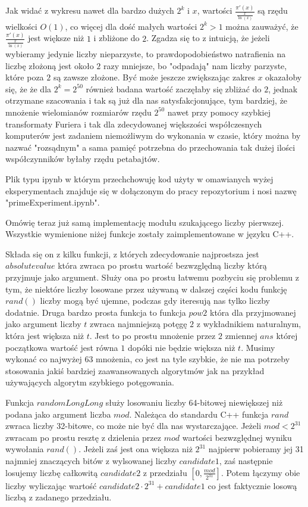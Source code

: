 \documentclass{article}
\begin{document}
Jak widać z wykresu nawet dla bardzo dużych $2^k$ i $x$, wartości $\frac{\pi'(x)}{\frac{x}{\ln(x)}}$ są 
rzędu wielkości $O(1)$, co więcej dla dość małych wartości $2^k>1$ można zauważyć, że $\frac{\pi'(x)}{\frac{x}{\ln(x)}}$ jest 
większe niż $1$ i zbliżone do $2$. Zgadza się to z intuicją, że jeżeli wybieramy jedynie liczby nieparzyste,
to prawdopodobieństwo natrafienia na liczbę złożoną jest około $2$ razy mniejsze, bo "odpadają" nam 
liczby parzyste, które poza $2$ są zawsze złożone. Być może jeszcze zwiększając zakres $x$ okazałoby się, że 
że dla $2^k=2^{50}$ również badana wartość zaczęłaby się zbliżać do $2$, jednak otrzymane szacowania i tak
są już dla nas satysfakcjonujące, tym bardziej, że mnożenie wielomianów rozmiarów rzędu $2^{50}$ nawet przy pomocy
szybkiej transformaty Furiera i tak dla zdecydowanej większości współczesnych komputerów jest zadaniem niemożliwym
do wykonania w czasie, który można by nazwać "rozsądnym" a sama pamięć potrzebna do przechowania
tak dużej ilości współczynników byłaby rzędu petabajtów. 

Plik typu ipynb w którym przechchowuję kod użyty w omawianych wyżej eksperymentach znajduje się
w dołączonym do pracy repozytorium i nosi nazwę "primeExperiment.ipynb".


Omówię teraz już samą implementację modułu szukającego liczby pierwszej. Wszystkie wymienione niżej funkcje zostały 
zaimplementowane w języku C++.

Składa się on z kilku funkcji, z których zdecydowanie najprostsza jest $absolutevalue$ która
zwraca po prostu wartość bezwzględną liczby którą przyjmuje jako argument. Służy ona po prostu
łatwemu pozbyciu się problemu z tym, że niektóre liczby losowane przez używaną w dalszej
części kodu funkcję $rand()$ liczby mogą być ujemne, podczas gdy iteresują nas tylko liczby dodatnie. 
Druga bardzo prosta funkcja to funkcja $pow2$ która dla przyjmowanej jako argument liczby $t$ 
zwraca najmniejszą potęgę $2$ z wykładnikiem naturalnym, która jest większa niż $t$. Jest to po prostu
mnożenie przez $2$ zmiennej $ans$ której początkowa wartość jest równa $1$ dopóki nie będzie 
większa niż $t$. Musimy wykonać co najwyżej $63$ mnożenia, co jest na tyle szybkie, że nie ma 
potrzeby stosowania jakiś bardziej zaawansowanych algorytmów jak na przykład 
używających algorytm szybkiego potęgowania.

Funkcja $randomLongLong$ służy losowaniu liczby 64-bitowej niewiększej niż podana jako argument 
liczba $mod$. Należąca do standardu C++ funkcja $rand$ zwraca liczby 32-bitowe, co może nie być dla nas
wystarczające. Jeżeli $mod<2^{31}$ zwracam po prostu resztę z dzielenia przez $mod$ wartości bezwzględnej
wyniku wywołania $rand()$. Jeżeli zaś jest ona większa niż $2^{31}$ najpierw pobieramy jej 31 
najmniej znaczących bitów z wylsowanej liczby $candidate1$, zaś następnie losujemy liczbę 
całkowitą $candidate2$ z przedziału $[0,\frac{mod}{2^{31}}]$.
Potem łączymy obie liczby wyliczając wartość $candidate2 \cdot 2^{31}+candidate1$ co jest faktycznie 
losową liczbą z zadanego przedziału.
\end{document}
